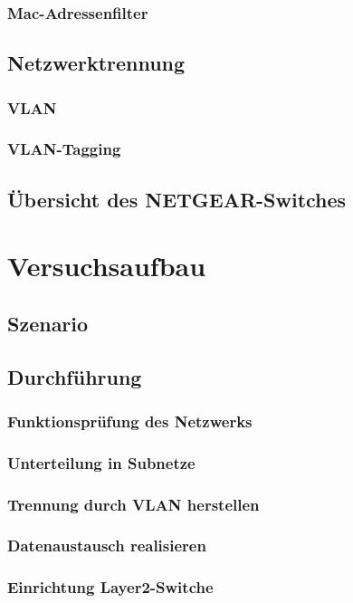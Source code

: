\documentclass[a4paper, 11pt]{scrartcl}
\begin{document}
    \subsubsection{Mac-Adressenfilter}
    \newpage
    \subsection{Netzwerktrennung}
    \subsubsection{VLAN}
    \subsubsection{VLAN-Tagging}
    \newpage
    \subsection{Übersicht des NETGEAR-Switches}
    
    \newpage
    \section{Versuchsaufbau}
    \subsection{Szenario}
    \subsection{Durchführung}
    \subsubsection{Funktionsprüfung des Netzwerks}
    \subsubsection{Unterteilung in Subnetze}
    \subsubsection{Trennung durch VLAN herstellen}
    \subsubsection{Datenaustausch realisieren}
    \subsubsection{Einrichtung Layer2-Switche}
\end{document}

